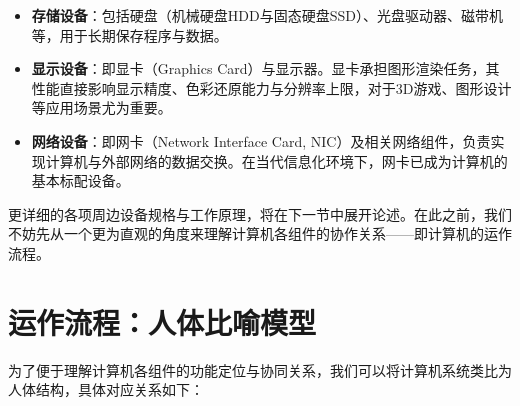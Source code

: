 \documentclass[12pt,UTF8]{ctexbook}
\begin{document}
\begin{itemize}
\item \textbf{存储设备}：包括硬盘（机械硬盘HDD与固态硬盘SSD）、光盘驱动器、磁带机等，用于长期保存程序与数据。
\item \textbf{显示设备}：即显卡（Graphics Card）与显示器。显卡承担图形渲染任务，其性能直接影响显示精度、色彩还原能力与分辨率上限，对于3D游戏、图形设计等应用场景尤为重要。
\item \textbf{网络设备}：即网卡（Network Interface Card, NIC）及相关网络组件，负责实现计算机与外部网络的数据交换。在当代信息化环境下，网卡已成为计算机的基本标配设备。
\end{itemize}

更详细的各项周边设备规格与工作原理，将在下一节中展开论述。在此之前，我们不妨先从一个更为直观的角度来理解计算机各组件的协作关系——即计算机的运作流程。

\section{运作流程：人体比喻模型}

为了便于理解计算机各组件的功能定位与协同关系，我们可以将计算机系统类比为人体结构，具体对应关系如下：
\end{document}
